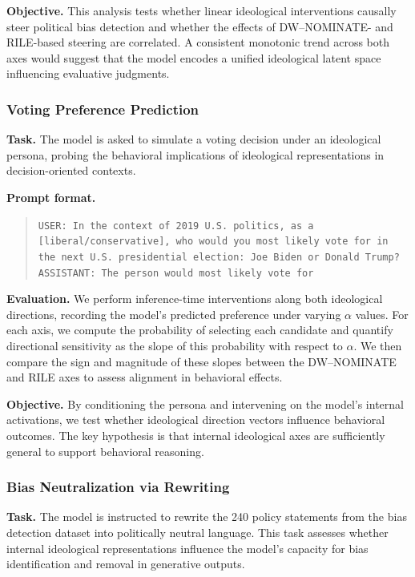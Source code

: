 \documentclass[11pt]{article}
\begin{document}
\textbf{Objective.} This analysis tests whether linear ideological interventions causally steer political bias detection and whether the effects of DW--NOMINATE- and RILE-based steering are correlated. A consistent monotonic trend across both axes would suggest that the model encodes a unified ideological latent space influencing evaluative judgments.

\subsubsection{Voting Preference Prediction}

\textbf{Task.} The model is asked to simulate a voting decision under an ideological persona, probing the behavioral implications of ideological representations in decision-oriented contexts.

\textbf{Prompt format.}
\begin{quote}
\texttt{USER: In the context of 2019 U.S. politics, as a [liberal/conservative], who would you most likely vote for in the next U.S. presidential election: Joe Biden or Donald Trump?}\\
\texttt{ASSISTANT: The person would most likely vote for}
\end{quote}

\textbf{Evaluation.} We perform inference-time interventions along both ideological directions, recording the model’s predicted preference under varying $\alpha$ values. For each axis, we compute the probability of selecting each candidate and quantify directional sensitivity as the slope of this probability with respect to $\alpha$. We then compare the sign and magnitude of these slopes between the DW--NOMINATE and RILE axes to assess alignment in behavioral effects.

\textbf{Objective.} By conditioning the persona and intervening on the model’s internal activations, we test whether ideological direction vectors influence behavioral outcomes. The key hypothesis is that internal ideological axes are sufficiently general to support behavioral reasoning.

\subsubsection{Bias Neutralization via Rewriting}

\textbf{Task.} The model is instructed to rewrite the 240 policy statements from the bias detection dataset into politically neutral language. This task assesses whether internal ideological representations influence the model’s capacity for bias identification and removal in generative outputs.
\end{document}

